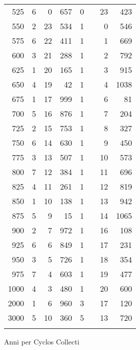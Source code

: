 \begin{tabnums}
\begin{tabular}[c]{@{} r rrr r@{}lrr @{}}
 525 & 6 &  0 &  657 & 0&& 23 &  423 \\
 550 & 2 & 23 &  534 & 1&&  0 &  546 \\
 575 & 6 & 22 &  411 & 1&&  1 &  669 \\
 600 & 3 & 21 &  288 & 1&&  2 &  792 \\
 625 & 1 & 20 &  165 & 1&&  3 &  915 \\
 650 & 4 & 19 &   42 & 1&&  4 & 1038 \\
 675 & 1 & 17 &  999 & 1&&  6 &   81 \\
 700 & 5 & 16 &  876 & 1&&  7 &  204 \\
 725 & 2 & 15 &  753 & 1&&  8 &  327 \\
 750 & 6 & 14 &  630 & 1&&  9 &  450 \\
 775 & 3 & 13 &  507 & 1&& 10 &  573 \\
 800 & 7 & 12 &  384 & 1&& 11 &  696 \\
 825 & 4 & 11 &  261 & 1&& 12 &  819 \\
 850 & 1 & 10 &  138 & 1&& 13 &  942 \\
 875 & 5 &  9 &   15 & 1&& 14 & 1065 \\
 900 & 2 &  7 &  972 & 1&& 16 &  108 \\
 925 & 6 &  6 &  849 & 1&& 17 &  231 \\
 950 & 3 &  5 &  726 & 1&& 18 &  354 \\
 975 & 7 &  4 &  603 & 1&& 19 &  477 \\
1000 & 4 &  3 &  480 & 1&& 20 &  600 \\
2000 & 1 &  6 &  960 & 3&\super{*}
 & 17 &  120 \\
3000 & 5 & 10 &  360 & 5&\super{*}
 & 13 &  720 \\
\tabfootrule
\multicolumn{3}{r}{\footnotesize\super{*}In originalis: 1}
\end{tabular}
\caption{Anni per Cyclos Collecti}
\label{tab:p203a}
\end{tabnums}
